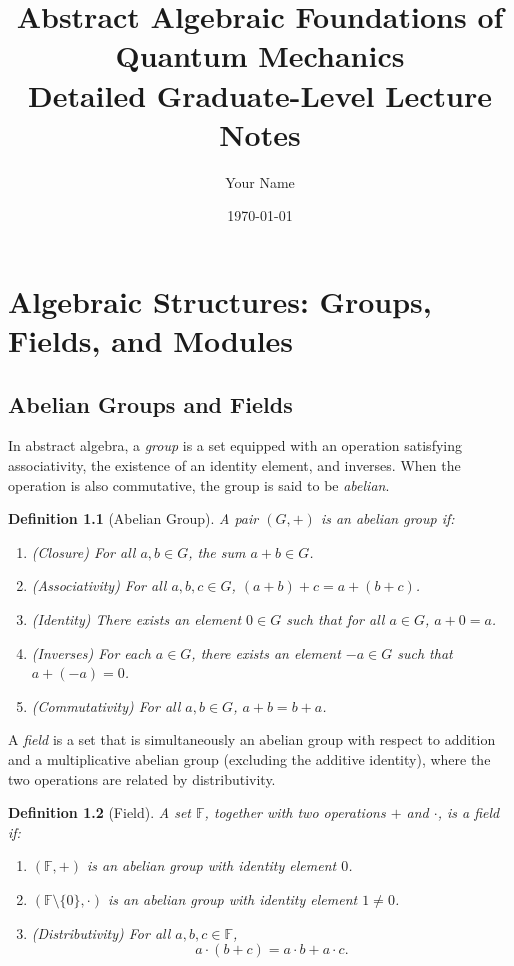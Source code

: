 \documentclass[11pt,oneside]{book}
\newtheorem{definition}{Definition}[chapter]
\theoremstyle{remark}
\begin{document}
	
	\frontmatter
	\title{Abstract Algebraic Foundations of Quantum Mechanics\\[1ex]
		\large Detailed Graduate-Level Lecture Notes}
	\author{Your Name}
	\date{\today}
	\maketitle
	\tableofcontents
	
	\mainmatter
	
	\chapter{Algebraic Structures: Groups, Fields, and Modules}
	\section{Abelian Groups and Fields}
	In abstract algebra, a \emph{group} is a set equipped with an operation satisfying associativity, the existence of an identity element, and inverses. When the operation is also commutative, the group is said to be \emph{abelian}.
	
	\begin{definition}[Abelian Group]
		A pair $(G, +)$ is an \emph{abelian group} if:
		\begin{enumerate}[label=(\roman*)]
			\item (Closure) For all $a,b\in G$, the sum $a+b \in G$.
			\item (Associativity) For all $a,b,c\in G$, $(a+b)+c = a+(b+c)$.
			\item (Identity) There exists an element $0 \in G$ such that for all $a\in G$, $a+0=a$.
			\item (Inverses) For each $a\in G$, there exists an element $-a \in G$ such that $a+(-a)=0$.
			\item (Commutativity) For all $a,b\in G$, $a+b = b+a$.
		\end{enumerate}
	\end{definition}
	
	A \emph{field} is a set that is simultaneously an abelian group with respect to addition and a multiplicative abelian group (excluding the additive identity), where the two operations are related by distributivity.
	
	\begin{definition}[Field]
		A set $\mathbb{F}$, together with two operations $+$ and $\cdot$, is a \emph{field} if:
		\begin{enumerate}[label=(\roman*)]
			\item $(\mathbb{F},+)$ is an abelian group with identity element $0$.
			\item $(\mathbb{F}\setminus\{0\},\cdot)$ is an abelian group with identity element $1\neq 0$.
			\item (Distributivity) For all $a,b,c\in \mathbb{F}$, 
			\[
			a\cdot(b+c)= a\cdot b + a\cdot c.
			\]
		\end{enumerate}
	\end{definition}
	
\end{document}

